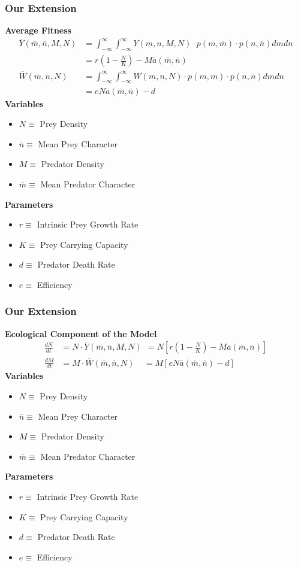 \documentclass[10pt]{beamer}
\begin{document}
\begin{frame}
	\frametitle{Our Extension}
	{\bf Average Fitness}
	\begin{align*}
	\overline{Y}(\overline{m}, \overline{n}, M, N) &= \int_{-\infty}^{\infty}\int_{-\infty}^{\infty} Y(m, n, M, N) \cdot p(m, \overline{m}) \cdot p(n, \overline{n}) dm dn \\
	&= r\left(1 - \frac{N}{K}\right) - M\overline{a}(\overline{m}, \overline{n}) \\[.1cm]
	\overline{W}(\overline{m}, \overline{n}, N) &= \int_{-\infty}^{\infty}\int_{-\infty}^{\infty} W(m, n, N) \cdot p(m, \overline{m}) \cdot p(n, \overline{n}) dm dn \\
	&= eN\overline{a}(\overline{m}, \overline{n}) - d
	\end{align*}
	{\bf Variables}
	\begin{itemize}
		\item $N \equiv $ Prey Density
		\item $\overline{n} \equiv $ Mean Prey Character
		\item $M \equiv $ Predator Density
		\item $\overline{m} \equiv $ Mean Predator Character
	\end{itemize}
	{\bf Parameters}
	\begin{itemize}
		\item $r \equiv $ Intrinsic Prey Growth Rate
		\item $K \equiv $ Prey Carrying Capacity
		\item $d \equiv $ Predator Death Rate
		\item $e \equiv $ Efficiency
	\end{itemize}
\end{frame}
\begin{frame}
	\frametitle{Our Extension}
	{\bf Ecological Component of the Model}
	\begin{align*}
	\frac{dN}{dt} &= N\cdot \overline{Y}(\overline{m}, \overline{n}, M, N)\ \ = N\left[r\left(1 - \frac{N}{K}\right) - M\overline{a}(\overline{m}, \overline{n})\right]\\[.1cm]
	\frac{dM}{dt} &= M\cdot \overline{W}(\overline{m}, \overline{n}, N)\ \ \ \ \ = M\left[eN\overline{a}(\overline{m}, \overline{n}) - d\right]
	\end{align*}
	{\bf Variables}
	\begin{itemize}
		\item $N \equiv $ Prey Density
		\item $\overline{n} \equiv $ Mean Prey Character
		\item $M \equiv $ Predator Density
		\item $\overline{m} \equiv $ Mean Predator Character
	\end{itemize}
	{\bf Parameters}
	\begin{itemize}
		\item $r \equiv $ Intrinsic Prey Growth Rate
		\item $K \equiv $ Prey Carrying Capacity
		\item $d \equiv $ Predator Death Rate
		\item $e \equiv $ Efficiency
	\end{itemize}
\end{frame}
\end{document}

